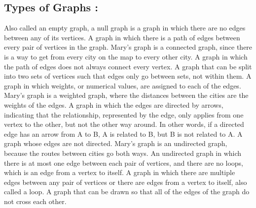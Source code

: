 \documentclass[12pt,letterpaper]{report}
\begin{document}
\subsection{Types of Graphs : }
\begin{enumerate}
{\color{orange}{\large \item Null graph:}} Also called an empty graph, a null graph is a graph in which there are no edges between any of its vertices.
{\color{orange}{\large \item Connected graph :}}A graph in which there is a path of edges between every pair of vertices in the graph. Mary's graph is a connected graph, since there is a way to get from every city on the map to every other city.
{\color{orange}{\large \item Disconnected graph :}}A graph in which the path of edges does not always connect every vertex.
{\color{orange}{\large \item Bipartite graph: }}A graph that can be split into two sets of vertices such that edges only go between sets, not within them.
{\color{orange}{\large \item Weighted graph: }}A graph in which weights, or numerical values, are assigned to each of the edges. Mary's graph is a weighted graph, where the distances between the cities are the weights of the edges.
{\color{orange}{\large \item Directed graph: }}A graph in which the edges are directed by arrows, indicating that the relationship, represented by the edge, only applies from one vertex to the other, but not the other way around. In other words, if a directed edge has an arrow from A to B, A is related to B, but B is not related to A.
{\color{orange}{\large \item Undirected graph:} }A graph whose edges are not directed. Mary's graph is an undirected graph, because the routes between cities go both ways.
{\color{orange}{\large \item Simple graph:}}An undirected graph in which there is at most one edge between each pair of vertices, and there are no loops, which is an edge from a vertex to itself.
{\color{orange}{\large \item Multi-graph: }}A graph in which there are multiple edges between any pair of vertices or there are edges from a vertex to itself, also called a loop.
{\color{orange}{\large \item Planar graph: }}A graph that can be drawn so that all of the edges of the graph do not cross each other.
 

\end{enumerate}
\end{document}
